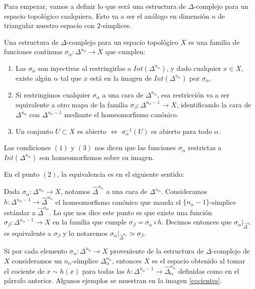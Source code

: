 Para empezar, vamos a definir lo que será una estructura de $\Delta$-complejo para un espacio topológico cualquiera. Esto va a ser el análogo en dimensión $n$ de triangular nuestro espacio con $2$-símplices.\br


\begin{df}
    Una estructura de $\Delta$-complejo para un espacio topológico $X$ es una familia de funciones continuas $\sigma_\alpha:\Delta^{n_\alpha}\to X$ que cumplen:\br

    \begin{enumerate}
        \item Las $\sigma_\alpha$ son inyectivas al restringirlas a $Int(\Delta^{n_\alpha})$, y dado cualquier $x\in X$, existe algún $\alpha$ tal que $x$ está en la imagen de $Int(\Delta^{n_\alpha})$ por $\sigma_\alpha$.
        
        \item Si restringimos cualquier $\sigma_\alpha$ a una cara de $\Delta^{n_\alpha}$, esa restricción va a ser equivalente a otro mapa de la familia $\sigma_\beta:\Delta^{n_\alpha-1}\to X$, identificando la cara de $\Delta^{n_\alpha}$ con $\Delta^{n_\alpha-1}$ mediante el homeomorfismo canónico.

        \item Un conjunto $U\subset X$ es abierto $\iff$ $\sigma_\alpha^{-1}(U)$ es abierto para todo $\alpha$.
    \end{enumerate}
\end{df}\br

Las condiciones $(1)$ y $(3)$ nos dicen que las funciones $\sigma_\alpha$ restrictas a $Int(\Delta^{n_\alpha})$ son homeomorfismos sobre su imagen.\br

En el punto $(2)$, la equivalencia es en el siguiente sentido: \br

Dada $\sigma_\alpha:\Delta^{n_\alpha}\to X$, notamos $\hat{\Delta}^{n_\alpha}$ a una cara de $\Delta^{n_\alpha}$. Consideramos $h:\Delta^{n_\alpha -1}\to\hat{\Delta}^{n_\alpha}$ el homeomorfismo canónico que manda el $\{n_\alpha -1\}$-símplice estándar a $\hat{\Delta}^{n_\alpha}$. Lo que nos dice este punto es que existe una función $\sigma_\beta:\Delta^{n_\alpha -1}\to X$ en la familia que cumple $\sigma_\beta=\sigma_\alpha\circ h$. Decimos entonces que $\sigma_\alpha |_{\hat{\Delta}^{n_\alpha}}$ es equivalente a $\sigma_\beta$ y lo notaremos $\sigma_\alpha |_{\hat{\Delta}^{n_\alpha}}\simeq\sigma_\beta$.\br

Si por cada elemento $\sigma_\alpha:\Delta^{n_\alpha}\to X$ proveniente de la estructura de $\Delta$-complejo de $X$ consideramos un $n_\alpha$-símplice $\Delta^{n_\alpha}_\alpha$, entonces $X$ es el espacio obtenido al tomar el cociente de $x\sim h(x)$ para todas las $h:\Delta^{n_\alpha -1}\to \hat{\Delta}^{n_\alpha}_\alpha$ definidas como en el párrafo anterior. Algunos ejemplos se muestran en la imagen \ref{cocientes}.\br

